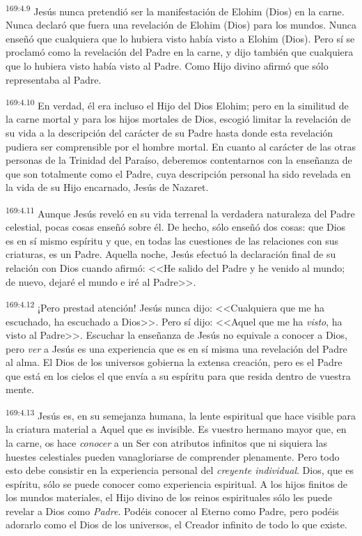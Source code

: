 \par 
\textsuperscript{169:4.9} Jesús nunca pretendió ser la manifestación de Elohim (Dios) en la carne. Nunca declaró que fuera una revelación de Elohim (Dios) para los mundos. Nunca enseñó que cualquiera que lo hubiera visto había visto a Elohim (Dios). Pero sí se proclamó como la revelación del Padre en la carne, y dijo también que cualquiera que lo hubiera visto había visto al Padre. Como Hijo divino afirmó que sólo representaba al Padre.

\par 
\textsuperscript{169:4.10} En verdad, él era incluso el Hijo del Dios Elohim; pero en la similitud de la carne mortal y para los hijos mortales de Dios, escogió limitar la revelación de su vida a la descripción del carácter de su Padre hasta donde esta revelación pudiera ser comprensible por el hombre mortal. En cuanto al carácter de las otras personas de la Trinidad del Paraíso, deberemos contentarnos con la enseñanza de que son totalmente como el Padre, cuya descripción personal ha sido revelada en la vida de su Hijo encarnado, Jesús de Nazaret.

\par 
\textsuperscript{169:4.11} Aunque Jesús reveló en su vida terrenal la verdadera naturaleza del Padre celestial, pocas cosas enseñó sobre él. De hecho, sólo enseñó dos cosas: que Dios es en sí mismo espíritu y que, en todas las cuestiones de las relaciones con sus criaturas, es un Padre. Aquella noche, Jesús efectuó la declaración final de su relación con Dios cuando afirmó: <<He salido del Padre y he venido al mundo; de nuevo, dejaré el mundo e iré al Padre>>.

\par 
\textsuperscript{169:4.12} ¡Pero prestad atención! Jesús nunca dijo: <<Cualquiera que me ha escuchado, ha escuchado a Dios>>. Pero sí dijo: <<Aquel que me ha \textit{visto}, ha visto al Padre>>. Escuchar la enseñanza de Jesús no equivale a conocer a Dios, pero \textit{ver} a Jesús es una experiencia que es en sí misma una revelación del Padre al alma. El Dios de los universos gobierna la extensa creación, pero es el Padre que está en los cielos el que envía a su espíritu para que resida dentro de vuestra mente.

\par 
\textsuperscript{169:4.13} Jesús es, en su semejanza humana, la lente espiritual que hace visible para la criatura material a Aquel que es invisible. Es vuestro hermano mayor que, en la carne, os hace \textit{conocer} a un Ser con atributos infinitos que ni siquiera las huestes celestiales pueden vanagloriarse de comprender plenamente. Pero todo esto debe consistir en la experiencia personal del \textit{creyente individual}. Dios, que es espíritu, sólo se puede conocer como experiencia espiritual. A los hijos finitos de los mundos materiales, el Hijo divino de los reinos espirituales sólo les puede revelar a Dios como \textit{Padre}. Podéis conocer al Eterno como Padre, pero podéis adorarlo como el Dios de los universos, el Creador infinito de todo lo que existe.